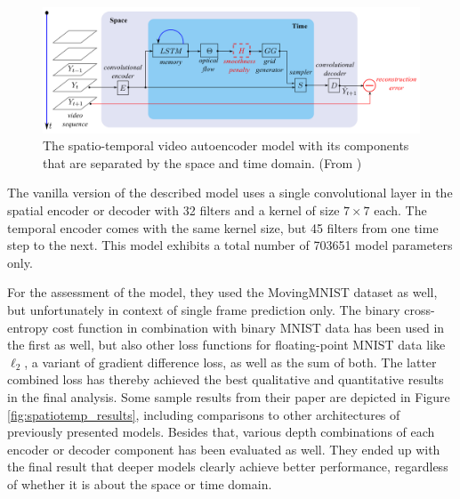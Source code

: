 \begin{figure}[htb]
	\centering
	\includegraphics[width=0.9\linewidth]{figures/related/spat_temp_video.png} 
	\caption[Spatio-Temporal Video Autoencoder Model]{The spatio-temporal video autoencoder model with its components that are separated by the space and time domain. (From \parencite{spat_temp_video_autoenc})} \label{fig:spatiotemp_model}
\end{figure}

The vanilla version of the described model uses a single convolutional layer in the spatial encoder or decoder with \num{32} filters and a kernel of size $7 \times 7$ each. The temporal encoder comes with the same kernel size, but \num{45} filters from one time step to the next. This model exhibits a total number of \num{703651} model parameters only. 

For the assessment of the model, they used the MovingMNIST dataset as well, but unfortunately in context of single frame prediction only. The binary cross-entropy cost function in combination with binary MNIST data has been used in the first as well, but also other loss functions for floating-point MNIST data like $\ell_2$, a variant of gradient difference loss, as well as the sum of both. The latter combined loss has thereby achieved the best qualitative and quantitative results in the final analysis. Some sample results from their paper are depicted in Figure \ref{fig:spatiotemp_results}, including comparisons to other architectures of previously presented models. Besides that, various depth combinations of each encoder or decoder component has been evaluated as well. They ended up with the final result that deeper models clearly achieve better performance, regardless of whether it is about the space or time domain.

